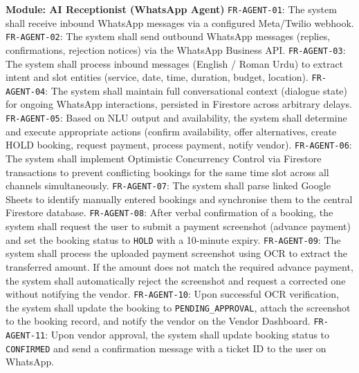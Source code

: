 \begin{outline}
  \1 \textbf{Module: AI Receptionist (WhatsApp Agent)}
  \2 \texttt{FR-AGENT-01}: The system shall receive inbound WhatsApp messages via a
       configured Meta/Twilio webhook.
  \2 \texttt{FR-AGENT-02}: The system shall send outbound WhatsApp messages
       (replies, confirmations, rejection notices) via the WhatsApp Business API.
  \2 \texttt{FR-AGENT-03}: The system shall process inbound messages (English /
       Roman Urdu) to extract intent and slot entities (service, date, time,
       duration, budget, location).
  \2 \texttt{FR-AGENT-04}: The system shall maintain full conversational context
       (dialogue state) for ongoing WhatsApp interactions, persisted in Firestore
       across arbitrary delays.
  \2 \texttt{FR-AGENT-05}: Based on NLU output and availability, the system shall
       determine and execute appropriate actions (confirm availability, offer
       alternatives, create HOLD booking, request payment, process payment, notify
       vendor).
  \2 \texttt{FR-AGENT-06}: The system shall implement Optimistic Concurrency Control
       via Firestore transactions to prevent conflicting bookings for the same time
       slot across all channels simultaneously.
  \2 \texttt{FR-AGENT-07}: The system shall parse linked Google Sheets to identify
       manually entered bookings and synchronise them to the central Firestore
       database.
  \2 \texttt{FR-AGENT-08}: After verbal confirmation of a booking, the system shall
       request the user to submit a payment screenshot (advance payment) and set the
       booking status to \texttt{HOLD} with a 10-minute expiry.
  \2 \texttt{FR-AGENT-09}: The system shall process the uploaded payment screenshot
       using OCR to extract the transferred amount.  If the amount does not match
       the required advance payment, the system shall automatically reject the
       screenshot and request a corrected one without notifying the vendor.
  \2 \texttt{FR-AGENT-10}: Upon successful OCR verification, the system shall update
       the booking to \texttt{PENDING\_APPROVAL}, attach the screenshot to the
       booking record, and notify the vendor on the Vendor Dashboard.
  \2 \texttt{FR-AGENT-11}: Upon vendor approval, the system shall update booking
       status to \texttt{CONFIRMED} and send a confirmation message with a ticket ID
       to the user on WhatsApp.


\end{outline}
